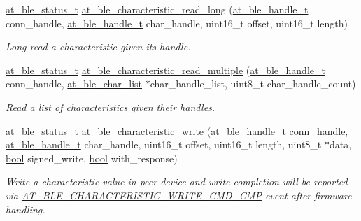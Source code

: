 \begin{DoxyCompactItemize}
\mbox{\hyperlink{group__error__codes__group_ga3b1db9b95feb157b3c188ca27fe76988}{at\+\_\+ble\+\_\+status\+\_\+t}} \mbox{\hyperlink{group__gatt__client__group_gaa7786450afbfc00a8a7f990c8c9bbc22}{at\+\_\+ble\+\_\+characteristic\+\_\+read\+\_\+long}} (\mbox{\hyperlink{at__ble__api_8h_abd23646d0c662860741f787efc8456f2}{at\+\_\+ble\+\_\+handle\+\_\+t}} conn\+\_\+handle, \mbox{\hyperlink{at__ble__api_8h_abd23646d0c662860741f787efc8456f2}{at\+\_\+ble\+\_\+handle\+\_\+t}} char\+\_\+handle, uint16\+\_\+t offset, uint16\+\_\+t length)
\begin{DoxyCompactList}\small\item\em Long read a characteristic given its handle. \end{DoxyCompactList}\item 
\mbox{\hyperlink{group__error__codes__group_ga3b1db9b95feb157b3c188ca27fe76988}{at\+\_\+ble\+\_\+status\+\_\+t}} \mbox{\hyperlink{group__gatt__client__group_ga00850152d4bd51ad41611d5792e0ae15}{at\+\_\+ble\+\_\+characteristic\+\_\+read\+\_\+multiple}} (\mbox{\hyperlink{at__ble__api_8h_abd23646d0c662860741f787efc8456f2}{at\+\_\+ble\+\_\+handle\+\_\+t}} conn\+\_\+handle, \mbox{\hyperlink{structat__ble__char__list}{at\+\_\+ble\+\_\+char\+\_\+list}} $\ast$char\+\_\+handle\+\_\+list, uint8\+\_\+t char\+\_\+handle\+\_\+count)
\begin{DoxyCompactList}\small\item\em Read a list of characteristics given their handles. \end{DoxyCompactList}\item 
\mbox{\hyperlink{group__error__codes__group_ga3b1db9b95feb157b3c188ca27fe76988}{at\+\_\+ble\+\_\+status\+\_\+t}} \mbox{\hyperlink{group__gatt__client__group_ga68ed4c6179da222ba25a61487a7926b9}{at\+\_\+ble\+\_\+characteristic\+\_\+write}} (\mbox{\hyperlink{at__ble__api_8h_abd23646d0c662860741f787efc8456f2}{at\+\_\+ble\+\_\+handle\+\_\+t}} conn\+\_\+handle, \mbox{\hyperlink{at__ble__api_8h_abd23646d0c662860741f787efc8456f2}{at\+\_\+ble\+\_\+handle\+\_\+t}} char\+\_\+handle, uint16\+\_\+t offset, uint16\+\_\+t length, uint8\+\_\+t $\ast$data, \mbox{\hyperlink{group__group__sam0__utils_ga97a80ca1602ebf2303258971a2c938e2}{bool}} signed\+\_\+write, \mbox{\hyperlink{group__group__sam0__utils_ga97a80ca1602ebf2303258971a2c938e2}{bool}} with\+\_\+response)
\begin{DoxyCompactList}\small\item\em Write a characteristic value in peer device and write completion will be reported via \mbox{\hyperlink{at__ble__api_8h_a3324640b95f33169515f89738ed5baeba0ca3bb3c57359b42fd8d578907e6c315}{A\+T\+\_\+\+B\+L\+E\+\_\+\+C\+H\+A\+R\+A\+C\+T\+E\+R\+I\+S\+T\+I\+C\+\_\+\+W\+R\+I\+T\+E\+\_\+\+C\+M\+D\+\_\+\+C\+MP}} event after firmware handling. \end{DoxyCompactList}\item 

\end{DoxyCompactItemize}
